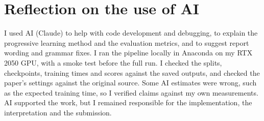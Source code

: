 \documentclass{COMPXXXX}
\begin{document}
\section*{Reflection on the use of AI}
I used AI (Claude) to help with code development and debugging, to explain the progressive learning
method and the evaluation metrics, and to suggest report wording and grammar fixes. I ran the pipeline
locally in Anaconda on my RTX 2050 GPU, with a smoke test before the full run. I checked the splits,
checkpoints, training times and scores against the saved outputs, and checked the paper's settings
against the original source. Some AI estimates were wrong, such as the expected training time, so I
verified claims against my own measurements. AI supported the work, but I remained responsible for the
implementation, the interpretation and the submission.


\end{document}
